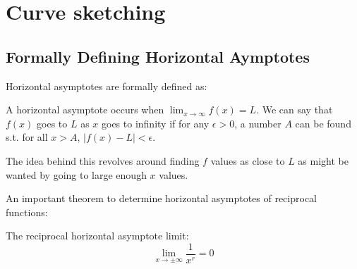 \documentclass{article}
\begin{document}
\section{Curve sketching}
\subsection{Formally Defining Horizontal Aymptotes}
Horizontal asymptotes are formally defined as:
\begin{definition}
    A horizontal asymptote occurs when $\lim_{x\to\infty}f(x)=L$. We can say that 
    $f(x)$ goes to $L$ as $x$ goes to infinity if for any $\epsilon>0$, a number $A$ can be found s.t. for all $x>A$, $|f(x)-L|<\epsilon$.
    \vspace{2mm}

    The idea behind this revolves around finding $f$ values as close to $L$ as might be wanted by going to large enough $x$ values.
\end{definition}
An important theorem to determine horizontal asymptotes of reciprocal functions:
\begin{theorem}
    The reciprocal horizontal asymptote limit:
    \begin{equation}
        \lim_{x\to \pm \infty} \frac{1}{x^r} = 0
        \label{eq:}
    \end{equation}
\end{theorem}
\end{document}
